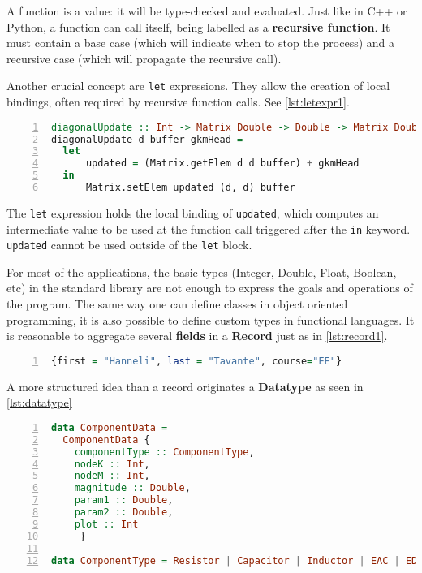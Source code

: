 A function is a value: it will be type-checked and evaluated. Just like in C++ or Python, a function can call itself, being labelled as a \textbf{recursive function}. It must contain a base case (which will indicate when to stop the process) and a recursive case (which will propagate the recursive call). 

Another crucial concept are \lstinline!let! expressions. They allow the creation of local bindings, often required by recursive function calls. See \cref{lst:letexpr1}.

\begin{lstlisting}[language=Haskell, numbers=left, caption={let expression}, captionpos=b, label={lst:letexpr1}]
diagonalUpdate :: Int -> Matrix Double -> Double -> Matrix Double
diagonalUpdate d buffer gkmHead =
  let 
      updated = (Matrix.getElem d d buffer) + gkmHead
  in  
      Matrix.setElem updated (d, d) buffer
\end{lstlisting}

The \lstinline!let! expression holds the local binding of \lstinline!updated!, which computes an intermediate value to be used at the function call triggered after the \lstinline!in! keyword. \lstinline!updated! cannot be used outside of the \lstinline!let! block.

For most of the applications, the basic types (Integer, Double, Float, Boolean, etc) in the standard library are not enough to express the goals and operations of the program. The same way one can define classes in object oriented programming, it is also possible to define custom types in functional languages. It is reasonable to aggregate several \textbf{fields} in a \textbf{Record} just as in \cref{lst:record1}.

\begin{lstlisting}[language=Haskell, numbers=left, caption={Record}, captionpos=b, label={lst:record1}]
{first = "Hanneli", last = "Tavante", course="EE"} 
\end{lstlisting}

A more structured idea than a record originates a \textbf{Datatype} as seen in \cref{lst:datatype}

\begin{lstlisting}[language=Haskell, numbers=left, caption={ComponentData datatype}, captionpos=b, label={lst:datatype}]
data ComponentData = 
  ComponentData { 
    componentType :: ComponentType,
    nodeK :: Int,
    nodeM :: Int,
    magnitude :: Double,
    param1 :: Double,
    param2 :: Double,
    plot :: Int
     }

data ComponentType = Resistor | Capacitor | Inductor | EAC | EDC
\end{lstlisting}

